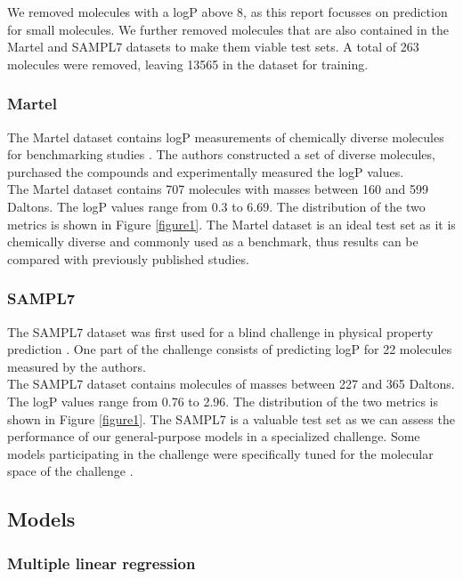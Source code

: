 \documentclass{article}
\begin{document}
We removed molecules with a logP above 8, as this report focusses on prediction for small molecules. We further removed molecules that are also contained in the Martel and SAMPL7 datasets to make them viable test sets. A total of 263 molecules were removed, leaving 13565 in the dataset for training.

\subsubsection{Martel}

The Martel dataset contains logP measurements of chemically diverse molecules for benchmarking studies \cite{martel2013large}. The authors constructed a set of diverse molecules, purchased the compounds and experimentally measured the logP values. \\

The Martel dataset contains 707 molecules with masses between 160 and 599 Daltons. The logP values range from 0.3 to 6.69. The distribution of the two metrics is shown in Figure \ref{figure1}. The Martel dataset is an ideal test set as it is chemically diverse and commonly used as a benchmark, thus results can be compared with previously published studies.

\subsubsection{SAMPL7}

The SAMPL7 dataset was first used for a blind challenge in physical property prediction \cite{bergazin2021evaluation}. One part of the challenge consists of predicting logP for 22 molecules measured by the authors. \\

The SAMPL7 dataset contains molecules of masses between 227 and 365 Daltons. The logP values range from 0.76 to 2.96. The distribution of the two metrics is shown in Figure \ref{figure1}. The SAMPL7 is a valuable test set as we can assess the performance of our general-purpose models in a specialized challenge. Some models participating in the challenge were specifically tuned for the molecular space of the challenge \cite{lenselink2021multitask}.

\subsection{Models}
\subsubsection{Multiple linear regression}
\end{document}
